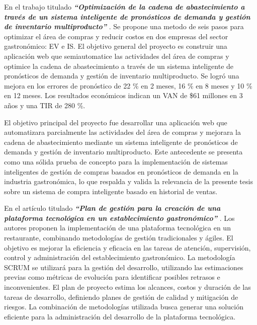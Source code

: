 \vspace{1\baselineskip}
En el trabajo titulado \textbf{\textit{ “Optimización de la cadena de abastecimiento a través de un sistema inteligente de pronósticos de demanda y gestión de inventario multiproducto”}} \cite{pacheco2015rediseno}. Se propone una metodo de seis pasos para optimizar el área de compras y reducir costos en dos empresas del sector gastronómico: EV e IS. El objetivo general del proyecto es construir una aplicación web que semiautomatice las actividades del área de compras y optimice la cadena de abastecimiento a través de un sistema inteligente de pronósticos de demanda y gestión de inventario multiproducto. Se logró una mejora en los errores de pronóstico de 22 \%   en 2 meses, 16 \% en 8 meses y 10 \% en 12 meses. Los resultados económicos indican un VAN de \$61 millones en 3 años y una TIR de 280 \%.

\vspace{1\baselineskip}
El objetivo principal del proyecto fue desarrollar una aplicación web que automatizara parcialmente las actividades del área de compras y mejorara la cadena de abastecimiento mediante un sistema inteligente de pronósticos de demanda y gestión de inventario multiproducto. 
Este antecedente se presenta como una sólida prueba de concepto para la implementación de sistemas inteligentes de gestión de compras basados en pronósticos de demanda en la industria gastronómica, lo que respalda y valida la relevancia de la presente tesis sobre un sistema de compra inteligente basado en historial de ventas.

\vspace{1\baselineskip}
En el artículo titulado  \textbf{\textit{“Plan de gestión para la creación de una plataforma tecnológica en un establecimiento gastronómico” }}\cite{sanchez2018sistemas}. Los autores proponen la implementación de una plataforma tecnológica en un restaurante, combinando metodologías de gestión tradicionales y ágiles. El objetivo es mejorar la eficiencia y eficacia en las tareas de atención, supervisión, control y administración del establecimiento gastronómico. La metodología SCRUM se utilizará para la gestión del desarrollo, utilizando las estimaciones previas como métricas de evolución para identificar posibles retrasos e inconvenientes. El plan de proyecto estima los alcances, costos y duración de las tareas de desarrollo, definiendo planes de gestión de calidad y mitigación de riesgos. La combinación de metodologías utilizada busca generar una solución eficiente para la administración del desarrollo de la plataforma tecnológica. 


